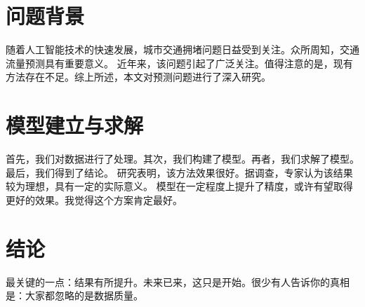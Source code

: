 
\section{问题背景}

随着人工智能技术的快速发展，城市交通拥堵问题日益受到关注。众所周知，交通流量预测具有重要意义。
近年来，该问题引起了广泛关注。值得注意的是，现有方法存在不足。综上所述，本文对预测问题进行了深入研究。

\section{模型建立与求解}

首先，我们对数据进行了处理。其次，我们构建了模型。再者，我们求解了模型。最后，我们得到了结论。
研究表明，该方法效果很好。据调查，专家认为该结果较为理想，具有一定的实际意义。
模型在一定程度上提升了精度，或许有望取得更好的效果。我觉得这个方案肯定最好。

\section{结论}

最关键的一点：结果有所提升。未来已来，这只是开始。很少有人告诉你的真相是：大家都忽略的是数据质量。
